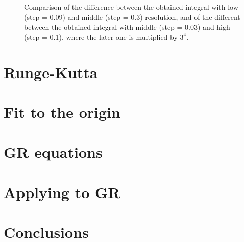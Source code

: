 \documentclass[11pt]{article}
\begin{document}
\begin{figure}[H]
    \centering
    \caption{Comparison of the difference between the obtained integral with low (step = 0.09) and middle (step = 0.3) resolution, and of the different between the obtained integral with middle (step = 0.03) and high (step = 0.1), where the later one is multiplied by $3^4$. }
    \label{fig:simp_conv}
\end{figure}




\section{Runge-Kutta}

\section{Fit to the origin}

\section{GR equations}

\section{Applying to GR}

\section{Conclusions}

\appendix





\end{document}
